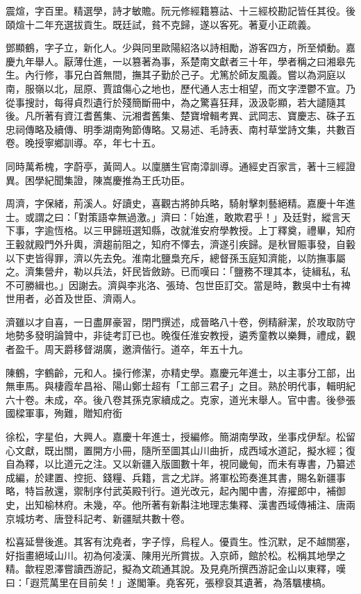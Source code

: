 \begin{pinyinscope}
震煊，字百里。精選學，詩才敏贍。阮元修經籍篡詁、十三經校勘記皆任其役。後頤煊十二年充選拔貢生。既廷試，貧不克歸，遂以客死。著夏小正疏義。

鄧顯鶴，字子立，新化人。少與同里歐陽紹洛以詩相勵，游客四方，所至傾動。嘉慶九年舉人。厭薄仕進，一以篡著為事，系楚南文獻者三十年，學者稱之曰湘皋先生。內行修，事兄白首無間，撫其子勤於己子。尤篤於師友風義。嘗以為洞庭以南，服嶺以北，屈原、賈誼傷心之地也，歷代通人志士相望，而文字湮鬱不宣。乃從事搜討，每得貞烈遺行於殘簡斷冊中，為之驚喜狂拜，汲汲彰顯，若大譴隨其後。凡所著有資江耆舊集、沅湘耆舊集、楚寶增輯考異、武岡志、寶慶志、硃子五忠祠傳略及續傳、明季湖南殉節傳略。又易述、毛詩表、南村草堂詩文集，共數百卷。晚授寧鄉訓導。卒，年七十五。

同時萬希槐，字蔚亭，黃岡人。以廩膳生官南漳訓導。通經史百家言，著十三經證異。困學紀聞集證，陳嵩慶推為王氏功臣。

周濟，字保緒，荊溪人。好讀史，喜觀古將帥兵略，騎射擊刺藝絕精。嘉慶十年進士。或謂之曰：「對策語幸無過激。」濟曰：「始進，敢欺君乎！」及廷對，縱言天下事，字逾恆格。以三甲歸班選知縣，改就淮安府學教授。上丁釋奠，禮畢，知府王轂就殿門外升輿，濟趨前阻之，知府不懌去，濟遂引疾歸。是秋冒賑事發，自轂以下吏皆得罪，濟以先去免。淮南北鹽梟充斥，總督孫玉庭知濟能，以防撫事屬之。濟集營弁，勒以兵法，奸民皆斂跡。已而嘆曰：「鹽務不理其本，徒緝私，私不可勝緝也。」因謝去。濟與李兆洛、張琦、包世臣訂交。當是時，數吳中士有裨世用者，必首及世臣、濟兩人。

濟雖以才自喜，一日盡屏豪習，閉門撰述，成晉略八十卷，例精辭潔，於攻取防守地勢多發明論贊中，非徒考訂已也。晚復任淮安教授，遴秀童教以樂舞，禮成，觀者盈千。周天爵移督湖廣，邀濟偕行。道卒，年五十九。

陳鶴，字鶴齡，元和人。操行修潔，亦精史學。嘉慶元年進士，以主事分工部，出無車馬。與棲霞牟昌裕、陽山鄭士超有「工部三君子」之目。熟於明代事，輯明紀六十卷。未成，卒。後八卷其孫克家續成之。克家，道光末舉人。官中書。後參張國樑軍事，殉難，贈知府銜

徐松，字星伯，大興人。嘉慶十年進士，授編修。簡湖南學政，坐事戍伊犁。松留心文獻，既出關，置開方小冊，隨所至圖其山川曲折，成西域水道記，擬水經；復自為釋，以比道元之注。又以新疆入版圖數十年，視同畿甸，而未有專書，乃纂述成編，於建置、控扼、錢糧、兵籍，言之尤詳。將軍松筠奏進其書，賜名新疆事略，特旨赦還，禦制序付武英殿刊行。道光改元，起內閣中書，洊擢郎中，補御史，出知榆林府。未幾，卒。他所著有新斠注地理志集釋、漢書西域傳補注、唐兩京城坊考、唐登科記考、新疆賦共數十卷。

松喜延譽後進。其客有沈堯者，字子惇，烏程人。優貢生。性沉默，足不越關塞，好指畫絕域山川。初為何凌漢、陳用光所賞拔。入京師，館於松。松稱其地學之精。歙程恩澤嘗讀西游記，擬為文疏通其說。及見堯所撰西游記金山以東釋，嘆曰：「遐荒萬里在目前矣！」遂閣筆。堯客死，張穆裒其遺著，為落颿樓槁。


\end{pinyinscope}
